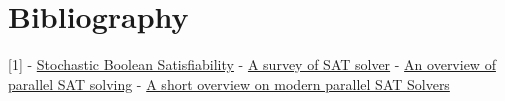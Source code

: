 \documentclass[12pt] {article}
\begin{document}
\newpage
\section{Bibliography}

[1] - \href{https://link.springer.com/article/10.1023/A:1017584715408}{Stochastic Boolean Satisfiability}
\newline
[2] - \href{https://doi.org/10.1063/1.4981999}{A survey of SAT solver}
\newline
[3] - \href{https://link.springer.com/article/10.1007/s10601-012-9121-3}{An overview of parallel SAT solving}
\newline
[4] - \href{https://www.researchgate.net/publication/254048189_A_short_overview_on_modern_parallel_SAT-solvers}{A short overview on modern parallel SAT Solvers}
\end{document}
